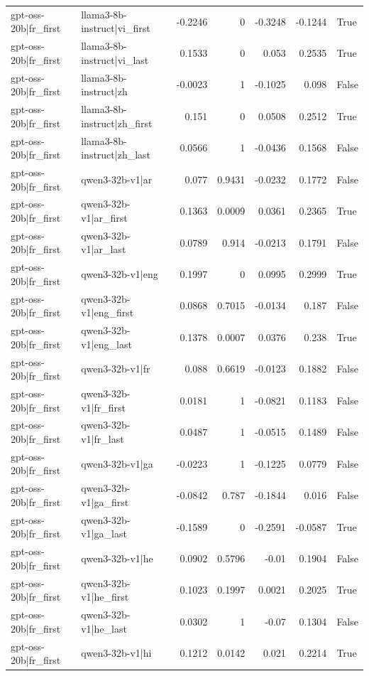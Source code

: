 \begin{table}
\begin{tabular}{l l r r r r l}
gpt-oss-20b|fr_first & llama3-8b-instruct|vi_first & -0.2246 & 0 & -0.3248 & -0.1244 & True \\
gpt-oss-20b|fr_first & llama3-8b-instruct|vi_last & 0.1533 & 0 & 0.053 & 0.2535 & True \\
gpt-oss-20b|fr_first & llama3-8b-instruct|zh & -0.0023 & 1 & -0.1025 & 0.098 & False \\
gpt-oss-20b|fr_first & llama3-8b-instruct|zh_first & 0.151 & 0 & 0.0508 & 0.2512 & True \\
gpt-oss-20b|fr_first & llama3-8b-instruct|zh_last & 0.0566 & 1 & -0.0436 & 0.1568 & False \\
gpt-oss-20b|fr_first & qwen3-32b-v1|ar & 0.077 & 0.9431 & -0.0232 & 0.1772 & False \\
gpt-oss-20b|fr_first & qwen3-32b-v1|ar_first & 0.1363 & 0.0009 & 0.0361 & 0.2365 & True \\
gpt-oss-20b|fr_first & qwen3-32b-v1|ar_last & 0.0789 & 0.914 & -0.0213 & 0.1791 & False \\
gpt-oss-20b|fr_first & qwen3-32b-v1|eng & 0.1997 & 0 & 0.0995 & 0.2999 & True \\
gpt-oss-20b|fr_first & qwen3-32b-v1|eng_first & 0.0868 & 0.7015 & -0.0134 & 0.187 & False \\
gpt-oss-20b|fr_first & qwen3-32b-v1|eng_last & 0.1378 & 0.0007 & 0.0376 & 0.238 & True \\
gpt-oss-20b|fr_first & qwen3-32b-v1|fr & 0.088 & 0.6619 & -0.0123 & 0.1882 & False \\
gpt-oss-20b|fr_first & qwen3-32b-v1|fr_first & 0.0181 & 1 & -0.0821 & 0.1183 & False \\
gpt-oss-20b|fr_first & qwen3-32b-v1|fr_last & 0.0487 & 1 & -0.0515 & 0.1489 & False \\
gpt-oss-20b|fr_first & qwen3-32b-v1|ga & -0.0223 & 1 & -0.1225 & 0.0779 & False \\
gpt-oss-20b|fr_first & qwen3-32b-v1|ga_first & -0.0842 & 0.787 & -0.1844 & 0.016 & False \\
gpt-oss-20b|fr_first & qwen3-32b-v1|ga_last & -0.1589 & 0 & -0.2591 & -0.0587 & True \\
gpt-oss-20b|fr_first & qwen3-32b-v1|he & 0.0902 & 0.5796 & -0.01 & 0.1904 & False \\
gpt-oss-20b|fr_first & qwen3-32b-v1|he_first & 0.1023 & 0.1997 & 0.0021 & 0.2025 & True \\
gpt-oss-20b|fr_first & qwen3-32b-v1|he_last & 0.0302 & 1 & -0.07 & 0.1304 & False \\
gpt-oss-20b|fr_first & qwen3-32b-v1|hi & 0.1212 & 0.0142 & 0.021 & 0.2214 & True \\

\end{tabular}
\end{table}
